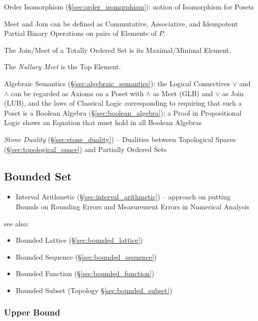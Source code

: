 Order Isomorphism (\S\ref{sec:order_isomorphism}): notion of
Isomorphism for Posets


Meet and Join can be defined as Commutative, Associative, and
Idempotent Partial Binary Operations on pairs of Elements of $P$.

The Join/Meet of a Totally Ordered Set is its Maximal/Minimal Element.

The \emph{Nullary Meet} is the Top Element.

\fist Algebraic Semantics (\S\ref{sec:algebraic_semantics}): the Logical
Connectives $\vee$ and $\wedge$ can be regarded as Axioms on a Poset with
$\wedge$ as Meet (GLB) and $\vee$ as Join (LUB), and the laws of Classical
Logic corresponding to requiring that such a Poset is a Boolean Algebra
(\S\ref{sec:boolean_algebra}); a Proof in Propositional Logic shows an Equation
that must hold in all Boolean Algebras

\fist \emph{Stone Duality} (\S\ref{sec:stone_duality}) -- Dualities between
Topological Spaces (\S\ref{sec:topological_space}) and Partially Ordered Sets



\subsection{Bounded Set}\label{sec:bounded_set}

\begin{itemize}
  \item Interval Arithmetic (\S\ref{sec:interval_arithmetic}) -- approach on
    putting Bounds on Rounding Errors and Measurement Errors in Numerical
    Analysis
\end{itemize}

see also:
\begin{itemize}
  \item Bounded Lattice (\S\ref{sec:bounded_lattice})
  \item Bounded Sequence (\S\ref{sec:bounded_sequence})
  \item Bounded Function (\S\ref{sec:bounded_function})
  \item Bounded Subset (Topology \S\ref{sec:bounded_subset})
\end{itemize}



\subsubsection{Upper Bound}\label{sec:upper_bound}



